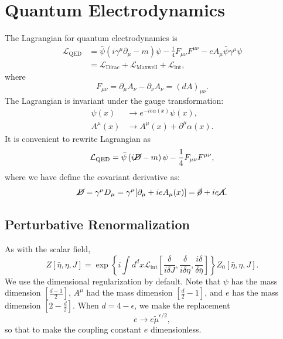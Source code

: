 \chapter{Quantum Electrodynamics}

The Lagrangian for quantum electrodynamics is
\begin{equation}
\begin{aligned}
	\mathcal{L}_{\mathrm{QED}}
	&= \bar\psi \left(i\gamma^\mu \partial_\mu - m\right)\psi - \frac{1}{4}F_{\mu\nu}F^{\mu\nu} -eA_\mu \bar\psi\gamma^\mu  \psi \\
	&= \mathcal{L}_{\mathrm{Dirac}}+\mathcal{L}_{\mathrm{Maxwell}}+\mathcal{L}_{\mathrm{int}},
\end{aligned}
\end{equation}
where
\begin{equation}
	F_{\mu\nu} = \partial_\mu A_\nu - \partial_\nu A_\nu = (dA)_{\mu\nu}.
\end{equation}
The Lagrangian is invariant under the gauge transformation:
\begin{equation}
\begin{aligned}
	\psi(x) &\rightarrow e^{-ie\alpha(x)}\psi(x), \\
	A^\mu(x) &\rightarrow A^\mu(x) + \partial^\mu \alpha(x).
\end{aligned}
\end{equation}
It is convenient to rewrite Lagrangian as
\begin{equation}
	\mathcal{L}_{\mathrm{QED}}
	= \bar\psi \left(i\cancel{D} - m\right)\psi - \frac{1}{4}F_{\mu\nu}F^{\mu\nu},
\end{equation}
where we have define the covariant derivative as:
\begin{equation}
	\cancel{D} = \gamma^\mu D_\mu 
	= \gamma^\mu [\partial_\mu + i e A_\mu(x)]
	= \cancel{\partial} + ie \cancel{A}.
\end{equation}


\section{Perturbative Renormalization}
As with the scalar field, 
\begin{equation}
	Z[\bar\eta,\eta,J] = \exp\left\{i\int d^dx \mathcal{L}_{\mathrm{int}}\left[\frac{\delta}{i\delta J},\frac{\delta}{i\delta \eta},\frac{i\delta}{\delta \bar\eta}\right]\right\} Z_0[\bar\eta,\eta,J].
\end{equation}
We use the dimensional regularization by default. 
Note that $\psi$ has the mass dimension $[\frac{d-1}{2}]$, $A^\mu$ had the mass dimension $[\frac{d}{2}-1]$, and $e$ has the mass dimension $[2-\frac{d}{2}]$.
When $d=4-\epsilon$, we make the replacement
\begin{equation}
	e \rightarrow e \tilde{\mu}^{\epsilon/2},
\end{equation}
so that to make the coupling constant $e$ dimensionless.

